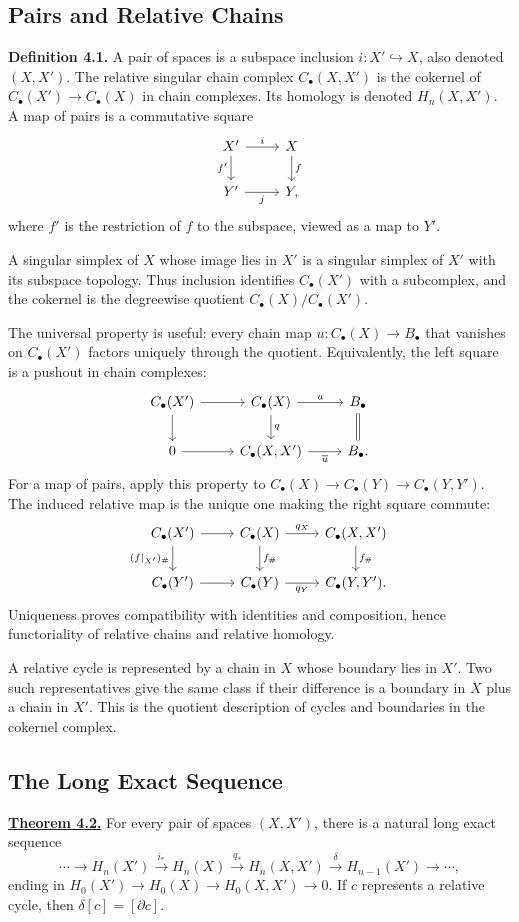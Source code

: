 \documentclass[11pt]{article}
\newcommand{\facehead}[1]{\par\Needspace{4\baselineskip}\subsection{#1}}
\begin{document}
\facehead{Pairs and Relative Chains}
\textbf{Definition 4.1.} A pair of spaces is a subspace inclusion $i:X'\hookrightarrow X$, also denoted $(X,X')$. The relative singular chain complex $C_\bullet(X,X')$ is the cokernel of $C_\bullet(X')\to C_\bullet(X)$ in chain complexes. Its homology is denoted $H_n(X,X')$. A map of pairs is a commutative square
\[
\begin{tikzcd}X'\arrow[r,"i"]\arrow[d,"f'"']&X\arrow[d,"f"]\\Y'\arrow[r,"j"']&Y,\end{tikzcd}
\]
where $f'$ is the restriction of $f$ to the subspace, viewed as a map to $Y'$.

A singular simplex of $X$ whose image lies in $X'$ is a singular simplex of $X'$ with its subspace topology. Thus inclusion identifies $C_\bullet(X')$ with a subcomplex, and the cokernel is the degreewise quotient $C_\bullet(X)/C_\bullet(X')$.

The universal property is useful: every chain map $u:C_\bullet(X)\to B_\bullet$ that vanishes on $C_\bullet(X')$ factors uniquely through the quotient. Equivalently, the left square is a pushout in chain complexes:
\[
\begin{tikzcd}
C_\bullet(X')\arrow[r]\arrow[d]&C_\bullet(X)\arrow[r,"u"]\arrow[d,"q"]&B_\bullet\arrow[d,equal]\\
0\arrow[r]&C_\bullet(X,X')\arrow[r,"\overline u"']&B_\bullet.
\end{tikzcd}
\]
For a map of pairs, apply this property to $C_\bullet(X)\to C_\bullet(Y)\to C_\bullet(Y,Y')$. The induced relative map is the unique one making the right square commute:
\[
\begin{tikzcd}
C_\bullet(X')\arrow[r]\arrow[d,"(f|_{X'})_\#"']&C_\bullet(X)\arrow[r,"q_X"]\arrow[d,"f_\#"]&C_\bullet(X,X')\arrow[d,"f_\#"]\\
C_\bullet(Y')\arrow[r]&C_\bullet(Y)\arrow[r,"q_Y"']&C_\bullet(Y,Y').
\end{tikzcd}
\]
Uniqueness proves compatibility with identities and composition, hence functoriality of relative chains and relative homology.

A relative cycle is represented by a chain in $X$ whose boundary lies in $X'$. Two such representatives give the same class if their difference is a boundary in $X$ plus a chain in $X'$. This is the quotient description of cycles and boundaries in the cokernel complex.

\facehead{The Long Exact Sequence}
\hypertarget{thm32}{}\textbf{\hyperlink{proof32}{Theorem 4.2.}} For every pair of spaces $(X,X')$, there is a natural long exact sequence
\[
\cdots\longrightarrow H_n(X')\xrightarrow{i_*}H_n(X)\xrightarrow{q_*}H_n(X,X')\xrightarrow{\delta}H_{n-1}(X')\longrightarrow\cdots,\tag{2}
\]
ending in $H_0(X')\to H_0(X)\to H_0(X,X')\to0$. If $c$ represents a relative cycle, then $\delta[c]=[\partial c]$.
\end{document}

